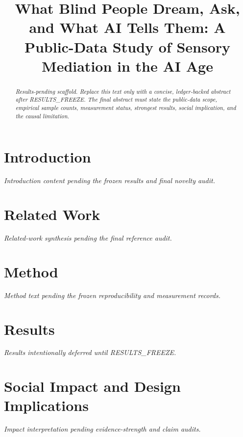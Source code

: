 \documentclass[manuscript,review,anonymous]{acmart}
\title{What Blind People Dream, Ask, and What AI Tells Them: A Public-Data Study of Sensory Mediation in the AI Age}
\begin{document}
\begin{abstract}
\textit{Results-pending scaffold. Replace this text only with a concise,
ledger-backed abstract after RESULTS\_FREEZE. The final abstract must state the
public-data scope, empirical sample counts, measurement status, strongest
results, social implication, and the causal limitation.}
\end{abstract}

\maketitle

\section{Introduction}
\textit{Introduction content pending the frozen results and final novelty audit.}

\section{Related Work}
\textit{Related-work synthesis pending the final reference audit.}

\section{Method}
\textit{Method text pending the frozen reproducibility and measurement records.}

\section{Results}
\textit{Results intentionally deferred until RESULTS\_FREEZE.}

\section{Social Impact and Design Implications}
\textit{Impact interpretation pending evidence-strength and claim audits.}
\end{document}
